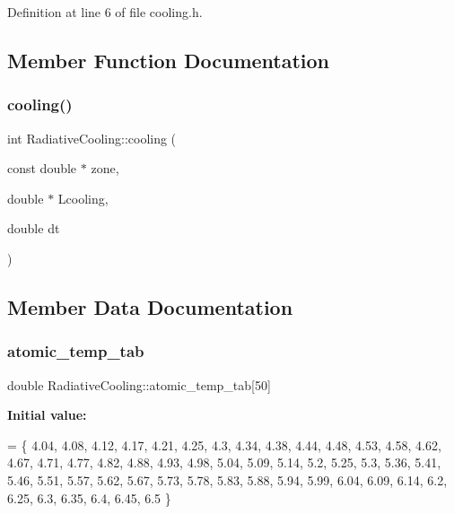 Definition at line 6 of file cooling.\+h.



\subsection{Member Function Documentation}
\mbox{\label{classRadiativeCooling_a5e4dbd5522e49baa82898ef742543e6d}} 
\subsubsection{\texorpdfstring{cooling()}{cooling()}}
{\footnotesize\ttfamily int Radiative\+Cooling\+::cooling (\begin{DoxyParamCaption}\item[{const double $\ast$}]{zone,  }\item[{double $\ast$}]{Lcooling,  }\item[{double}]{dt }\end{DoxyParamCaption})}



\subsection{Member Data Documentation}
\mbox{\label{classRadiativeCooling_a69beea13540c13fe1a9e133388c5c943}} 
\subsubsection{\texorpdfstring{atomic\+\_\+temp\+\_\+tab}{atomic\_temp\_tab}}
{\footnotesize\ttfamily double Radiative\+Cooling\+::atomic\+\_\+temp\+\_\+tab\mbox{[}50\mbox{]}\hspace{0.3cm}{\ttfamily [private]}}

{\bfseries Initial value\+:}
\begin{DoxyCode}
= \{
      4.04, 4.08, 4.12, 4.17, 4.21, 4.25, 4.3, 4.34, 4.38, 4.44, 4.48, 4.53,
      4.58, 4.62, 4.67, 4.71, 4.77, 4.82, 4.88, 4.93, 4.98, 5.04, 5.09, 5.14,
      5.2, 5.25, 5.3, 5.36, 5.41, 5.46, 5.51, 5.57, 5.62, 5.67, 5.73, 5.78,
      5.83, 5.88, 5.94, 5.99, 6.04, 6.09, 6.14, 6.2, 6.25, 6.3, 6.35, 6.4,
      6.45, 6.5
  \}
\end{DoxyCode}



